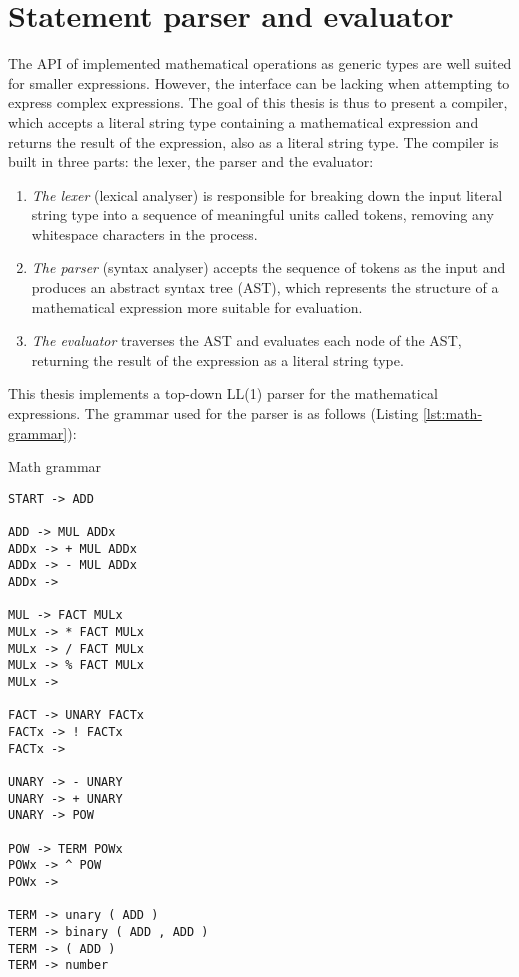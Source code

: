 \section{Statement parser and evaluator}

The API of implemented mathematical operations as generic types are well suited for smaller expressions. However, the interface can be lacking when attempting to express complex expressions. The goal of this thesis is thus to present a compiler, which accepts a literal string type containing a mathematical expression and returns the result of the expression, also as a literal string type. The compiler is built in three parts: the lexer, the parser and the evaluator:

\begin{enumerate}
  \item \textit{The lexer} (lexical analyser) is responsible for breaking down the input literal string type into a sequence of meaningful units called tokens, removing any whitespace characters in the process. 
  \item \textit{The parser} (syntax analyser) accepts the sequence of tokens as the input and produces an abstract syntax tree (AST), which represents the structure of a mathematical expression more suitable for evaluation. 
  \item \textit{The evaluator} traverses the AST and evaluates each node of the AST, returning the result of the expression as a literal string type.
\end{enumerate}

This thesis implements a top-down LL(1) parser for the mathematical expressions. The grammar used for the parser is as follows (Listing \ref{lst:math-grammar}):


\begin{listing}[ht]
\caption{Math grammar}\label{lst:math-grammar}
\begin{verbatim}
START -> ADD

ADD -> MUL ADDx
ADDx -> + MUL ADDx
ADDx -> - MUL ADDx
ADDx ->

MUL -> FACT MULx
MULx -> * FACT MULx
MULx -> / FACT MULx
MULx -> % FACT MULx
MULx ->

FACT -> UNARY FACTx
FACTx -> ! FACTx
FACTx ->

UNARY -> - UNARY
UNARY -> + UNARY
UNARY -> POW

POW -> TERM POWx
POWx -> ^ POW
POWx ->

TERM -> unary ( ADD )
TERM -> binary ( ADD , ADD )
TERM -> ( ADD )
TERM -> number
\end{verbatim}
\end{listing}


